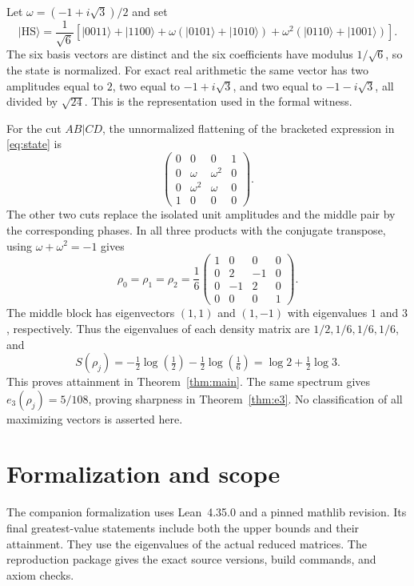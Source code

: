 \documentclass[11pt]{article}
\theoremstyle{definition}
\theoremstyle{remark}
\newcommand{\HS}{\mathrm{HS}}
\newcommand{\ket}[1]{\lvert #1\rangle}
\begin{document}
Let $\omega=(-1+i\sqrt3)/2$ and set
\begin{equation}
 \ket{\HS}=\frac1{\sqrt6}\left[
 \ket{0011}+\ket{1100}
 +\omega(\ket{0101}+\ket{1010})
 +\omega^2(\ket{0110}+\ket{1001})\right].
 \label{eq:state}
\end{equation}
The six basis vectors are distinct and the six coefficients have modulus
$1/\sqrt6$, so the state is normalized. For exact real arithmetic the
same vector has two amplitudes equal to $2$, two equal to
$-1+i\sqrt3$, and two equal to $-1-i\sqrt3$, all divided by $\sqrt{24}$.
This is the representation used in the formal witness.

For the cut $AB|CD$, the unnormalized flattening of the bracketed
expression in \eqref{eq:state} is
\[
 \begin{pmatrix}
 0&0&0&1\\
 0&\omega&\omega^2&0\\
 0&\omega^2&\omega&0\\
 1&0&0&0
 \end{pmatrix}.
\]
The other two cuts replace the isolated unit amplitudes and the middle
pair by the corresponding phases. In all three products with the
conjugate transpose, using $\omega+\omega^2=-1$ gives
\begin{equation}
 \rho_0=\rho_1=\rho_2=
 \frac16\begin{pmatrix}
 1&0&0&0\\
 0&2&-1&0\\
 0&-1&2&0\\
 0&0&0&1
 \end{pmatrix}.
 \label{eq:HSdensity}
\end{equation}
The middle block has eigenvectors $(1,1)$ and $(1,-1)$ with
eigenvalues $1$ and $3$, respectively. Thus the eigenvalues of each
density matrix are $1/2,1/6,1/6,1/6$, and
\[
 S(\rho_j)=-\tfrac12\log(\tfrac12)-\tfrac12\log(\tfrac16)
 =\log2+\tfrac12\log3.
\]
This proves attainment in Theorem~\ref{thm:main}. The same spectrum gives
$e_3(\rho_j)=5/108$, proving sharpness in Theorem~\ref{thm:e3}.
No classification of all maximizing vectors is asserted here.

\section{Formalization and scope}
\label{sec:verification}

The companion formalization uses Lean~4.35.0 and a pinned mathlib revision. Its final greatest-value statements include both the upper bounds and their attainment. They use the eigenvalues of the actual reduced matrices. The reproduction package gives the exact source versions, build commands, and axiom checks.
\end{document}
